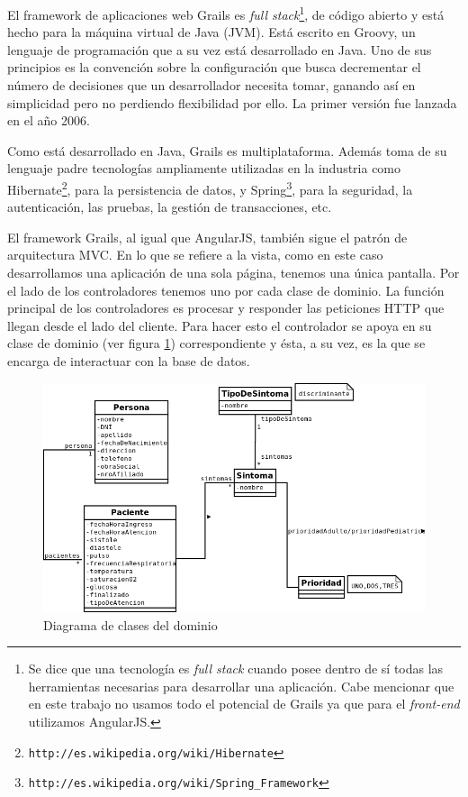El framework de aplicaciones web Grails es \textit{full stack}\footnote{Se dice que una tecnología es \textit{full stack} cuando posee dentro de sí todas las herramientas necesarias para desarrollar una aplicación. Cabe mencionar que en este trabajo no usamos todo el potencial de Grails ya que para el \textit{front-end} utilizamos AngularJS.}, de código abierto y está hecho para la máquina virtual de Java (JVM). Está escrito en Groovy, un lenguaje de programación que a su vez está desarrollado en Java. Uno de sus principios es la convención sobre la configuración que busca decrementar el número de decisiones que un desarrollador necesita tomar, ganando así en simplicidad pero no perdiendo flexibilidad por ello. La primer versión fue lanzada en el año 2006.

Como está desarrollado en Java, Grails es multiplataforma. Además toma de su lenguaje padre tecnologías ampliamente utilizadas en la industria como Hibernate\footnote{\texttt{http://es.wikipedia.org/wiki/Hibernate}}, para la persistencia de datos, y Spring\footnote{\texttt{http://es.wikipedia.org/wiki/Spring\_Framework}}, para la seguridad, la autenticación, las pruebas, la gestión de transacciones, etc.

El framework Grails, al igual que AngularJS, también sigue el patrón de arquitectura MVC. En lo que se refiere a la vista, como en este caso desarrollamos una aplicación de una sola página, tenemos una única pantalla. Por el lado de los controladores tenemos uno por cada clase de dominio. La función principal de los controladores es procesar y responder las peticiones HTTP que llegan desde el lado del cliente. Para hacer esto el controlador se apoya en su clase de dominio (ver figura \ref{fig:diagrama_de_clases}) correspondiente y ésta, a su vez, es la que se encarga de interactuar con la base de datos.
\begin{figure}
\centerline{\includegraphics[width=1.2\textwidth]{triage.png}}
\caption{Diagrama de clases del dominio}
\label{fig:diagrama_de_clases}
\end{figure}

